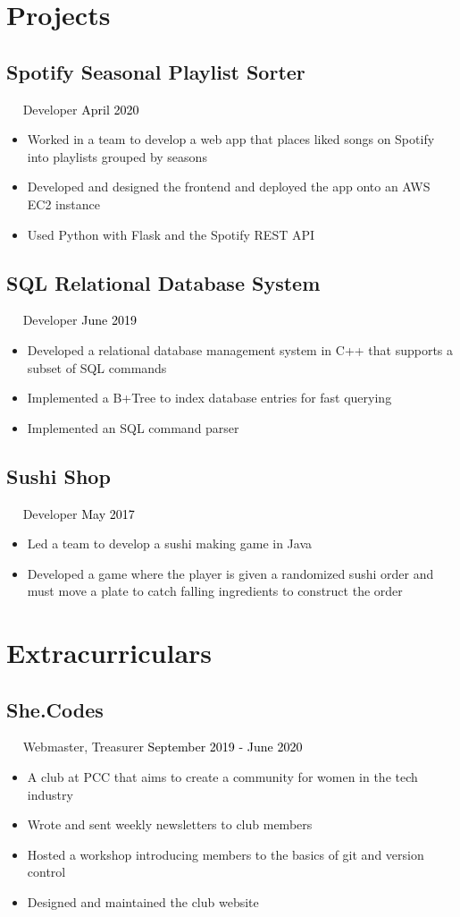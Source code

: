 \documentclass{article}
\newcommand{\resumesection}[3]{
    \subsection*{#1}
    \ 
    \ 
    \small
    \textcolor{csufgrey}{#2}
    \normalsize
    \hfill
    \textcolor{black}{#3}
    \normalsize
}
\begin{document}
\section*{Projects}
\resumesection{Spotify Seasonal Playlist Sorter}{Developer}{April 2020}
\begin{itemize}
    \item Worked in a team to develop a web app that places liked songs on Spotify into playlists grouped by seasons
    \item Developed and designed the frontend and deployed the app onto an AWS EC2 instance
    \item Used Python with Flask and the Spotify REST API
\end{itemize}

\resumesection{SQL Relational Database System}{Developer}{June 2019}
\begin{itemize}
    \item Developed a relational database management system in C++ that supports a subset of SQL commands
    \item Implemented a B+Tree to index database entries for fast querying
    \item Implemented an SQL command parser
\end{itemize}

\resumesection{Sushi Shop}{Developer}{May 2017}
\begin{itemize}
    \item Led a team to develop a sushi making game in Java
    \item Developed a game where the player is given a randomized sushi order and must move a plate to catch falling ingredients to construct the order
\end{itemize}
\hfill
\section*{Extracurriculars}
\resumesection{She.Codes}{Webmaster, Treasurer}{September 2019 - June 2020}
\begin{itemize}
    \item A club at PCC that aims to create a community for women in the tech industry
    \item Wrote and sent weekly newsletters to club members
    \item Hosted a workshop introducing members to the basics of git and version control
    \item Designed and maintained the club website
\end{itemize}
\hfill
\end{document}
